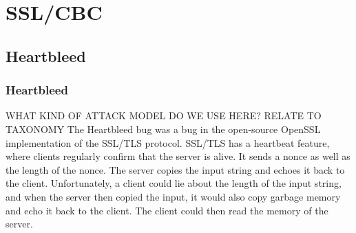     
\section{SSL/CBC}
    \subsection{Heartbleed}
        \begin{frame}
            \frametitle{Heartbleed}

                WHAT KIND OF ATTACK MODEL DO WE USE HERE? RELATE TO TAXONOMY
                The Heartbleed bug was a bug in the open-source OpenSSL implementation of the SSL/TLS protocol. SSL/TLS has a heartbeat feature, where clients regularly confirm that the server is alive. It sends a nonce as well as the length of the nonce. The server copies the input string and echoes it back to the client. Unfortunately, a client could lie about the length of the input string, and when the server then copied the input, it would also copy garbage memory and echo it back to the client. The client could then read the memory of the server. 
        \end{frame}

